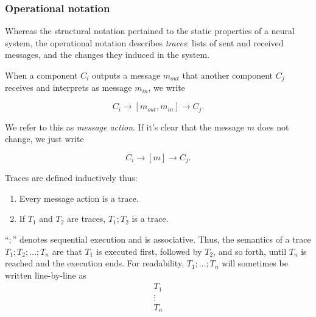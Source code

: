 \subsubsection{Operational notation}

Whereas the structural notation pertained to the static properties of a neural system, the operational notation describes {\em traces}: lists of sent and received messages, and the changes they induced in the system.

\begin{definition}
	When a component $C_i$ outputs a message $m_{out}$ that another component $C_j$ receives and interprets as message $m_{in}$, we write
	
	$$
		C_i \rightarrow [m_{out}, m_{in}] \rightarrow C_j.
	$$
	
	We refer to this as {\em message action}. If it's clear that the message $m$ does not change, we just write
	
	$$
		C_i \rightarrow [m] \rightarrow C_j.
	$$
\end{definition}

\begin{definition}[Trace]
	Traces are defined inductively thus:
		\begin{enumerate}
			\item Every message action is a trace.
			\item If $T_1$ and $T_2$ are traces, $T_1;T_2$ is a trace.
		\end{enumerate}
		
	``$;$'' denotes sequential execution and is associative. Thus, the semantics of a trace $T_1;T_2;\dots;T_n$ are that $T_1$ is executed first, followed by $T_2$, and so forth, until $T_n$ is reached and the execution ends.
	For readability, $T_1;\dots;T_n$ will sometimes be written line-by-line as
	$$
		\begin{array}{l}
		T_1\\
		\vdots\\
		T_n
		\end{array}
	$$
\end{definition}

